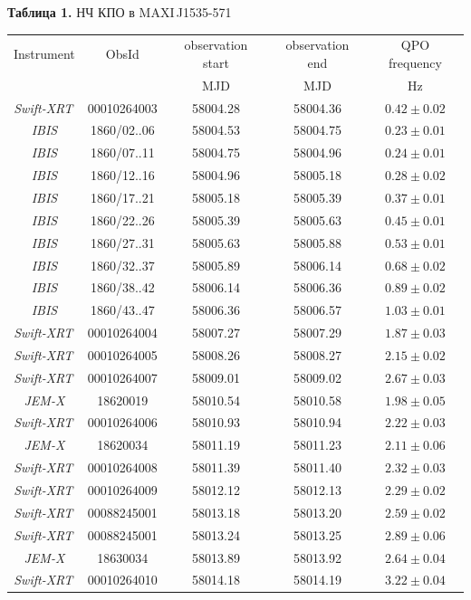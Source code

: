\documentclass{pazhb}
\def\swiftx{{\em Swift-XRT\,}}
\def\jemx{{\em JEM-X}}
\def\ibis{ {\em IBIS}}
\begin{document}
\begin{table}[t]
\vspace{6mm}
\centering
{{\bf Таблица 1.} НЧ КПО в \mbox{MAXI\,J1535-571}\protect\\}
\label{tab:qpo}
\vspace{5mm}\begin{tabular}{c|c|c|c|c} \hline\hline
Instrument & ObsId & observation start & observation end &  QPO frequency\\
                   &           &  MJD                     & MJD                    & Hz \\
\hline
\swiftx & 00010264003 &58004.28&58004.36&  $0.42\pm 0.02 $\\
\ibis & 1860/02..06 &58004.53&58004.75&  $0.23\pm 0.01 $\\
\ibis & 1860/07..11 &58004.75&58004.96&  $0.24\pm 0.01 $\\
\ibis & 1860/12..16 &58004.96&58005.18&  $0.28\pm 0.02 $\\
\ibis & 1860/17..21 &58005.18&58005.39&  $0.37\pm 0.01 $\\
\ibis & 1860/22..26 &58005.39&58005.63&  $0.45\pm 0.01 $\\
\ibis & 1860/27..31 &58005.63&58005.88&  $0.53\pm 0.01 $\\
\ibis & 1860/32..37 &58005.89&58006.14&  $0.68\pm 0.02 $\\
\ibis & 1860/38..42 &58006.14&58006.36&  $0.89\pm 0.02 $\\
\ibis & 1860/43..47 &58006.36&58006.57&  $1.03\pm 0.01 $\\
\swiftx & 00010264004 &58007.27&58007.29&  $1.87\pm 0.03 $\\
\swiftx & 00010264005 &58008.26&58008.27&  $2.15\pm 0.02 $\\
\swiftx & 00010264007 &58009.01&58009.02&  $2.67\pm 0.03 $\\
\jemx     & 18620019        & 58010.54 & 58010.58 & $1.98\pm 0.05 $\\
\swiftx & 00010264006 &58010.93&58010.94&  $2.22\pm 0.03 $\\
\jemx     & 18620034        & 58011.19 & 58011.23 & $2.11\pm 0.06 $\\
\swiftx &00010264008 &58011.39&58011.40&  $2.32\pm 0.03 $\\
\swiftx &00010264009 &58012.12&58012.13&  $2.29\pm 0.02 $\\
\swiftx &00088245001 &58013.18&58013.20&  $2.59\pm 0.02 $\\
\swiftx &00088245001 &58013.24&58013.25&  $2.89\pm 0.06 $\\
\jemx     & 18630034        & 58013.89 & 58013.92 & $2.64\pm 0.04 $\\ 
\swiftx &00010264010 &58014.18&58014.19&  $3.22\pm 0.04 $\\
\hline
\end{tabular}
\end{table}
\end{document}
